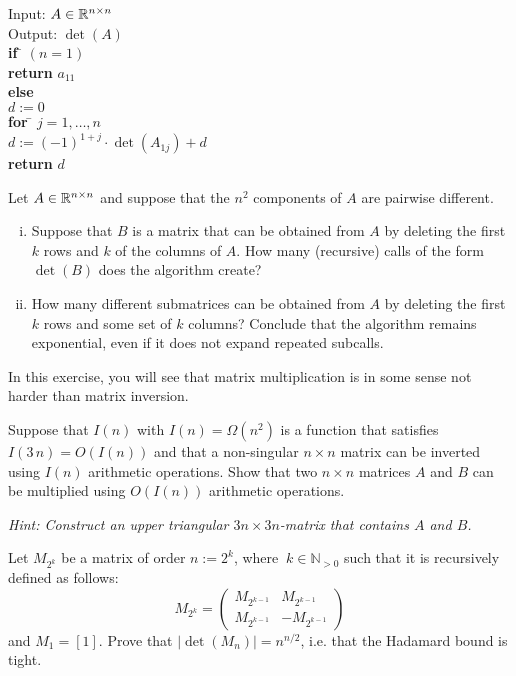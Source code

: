 \documentclass[11pt]{article}
\begin{document}
\begin{tabbing}
  Input: $A \in \mathbb{R}^{n \times n}$ \\
  Output: $\det(A)$ \\
  
  {\bf if} \= $(n=1)$ \\
           \> {\bf return} $a_{11}$ \\
  {\bf else} \\
           \> $d:=0$  \\
           \> {\bf for } \= $j=1,\dots,n$ \\
           \>            \> $d:= (-1)^{1+j}⋅  \det(A_{1j}) +d$\\
           \> {\bf return} $d$   
\end{tabbing}

Let $A \in \mathbb{R}^{n \times n}$  and suppose that the $n^2$ components of $A$ are pairwise different.
\begin{enumerate}[i)]
\item
Suppose that $B$ is a matrix that can be obtained from $A$ by deleting the first $k$ rows and $k$ of the columns of $A$. How many (recursive) calls of the form $\det(B)$ does the algorithm create? 

\item How many different submatrices can be obtained from $A$ by deleting the first $k$ rows and some set of $k$ columns? Conclude that the algorithm remains exponential, even if it does not expand repeated subcalls. 
\end{enumerate}
  
\problem In this exercise, you will see that matrix multiplication is in some sense not harder than matrix inversion. 

Suppose that $I(n)$ with $I(n)=\Omega(n^2)$ is a function that satisfies $I(3\,n) = O(I(n))$ and that a non-singular  $n \times n$ matrix can be inverted using $I(n)$ arithmetic operations. Show that two $n \times n $ matrices $A$ and $B$ can be multiplied using $O(I(n))$ arithmetic operations. 

\emph{Hint: Construct an upper triangular $3n \times 3n$-matrix that contains $A$ and $B$. }

\problemstar Let $M_{2^k}$ be a matrix of order $n:=2^k$, where $\ k \in \mathbb{N}_{>0}$ such that it is recursively defined as follows:
\begin{equation}
M_{2^k}=
\begin{pmatrix}
    M_{2^{k-1}} & M_{2^{k-1}} \\ 
    M_{2^{k-1}} & -M_{2^{k-1}} 
  \end{pmatrix}
\end{equation}
and $M_1=[1]$. Prove that $|\det(M_{n})|=n^{n/2}$, i.e. that the Hadamard bound is tight.
\end{document}

